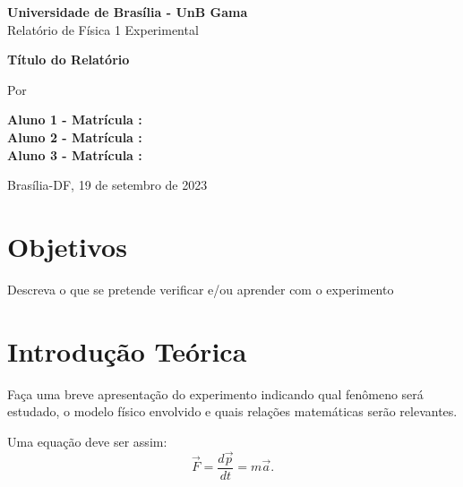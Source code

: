 \documentclass[12pt,a4paper]{article}
\begin{document}
\begin{titlepage}

\begin{center}

\large{\textbf{Universidade de Brasília - UnB Gama}}\\[1cm]



{\large Relatório de Física 1 Experimental}

\vspace{2.3cm}
{\large }
\vspace{2.6cm}



{\LARGE \bf  Título do Relatório} \vspace{2cm}

Por
%
\vspace{2cm}

{\bf Aluno 1 - Matrícula :\\
			Aluno 2 - Matrícula :\\
			Aluno 3 - Matrícula :}



%
\vspace*{\fill}

%
{Brasília-DF,  19 de setembro de 2023}


\end{center}
\end{titlepage}




\newpage


\section{Objetivos}
Descreva o que se pretende verificar e/ou aprender com o experimento



\section{Introdução Teórica}
Faça uma breve apresentação do experimento indicando qual fenômeno será estudado, o modelo físico envolvido e quais  relações matemáticas serão relevantes.


Uma equação deve ser assim:
\begin{equation}
\label{equacao1}
\vec{F} = \frac{d \vec{p}}{dt} = m\vec{a}.
\end{equation}
\end{document}
